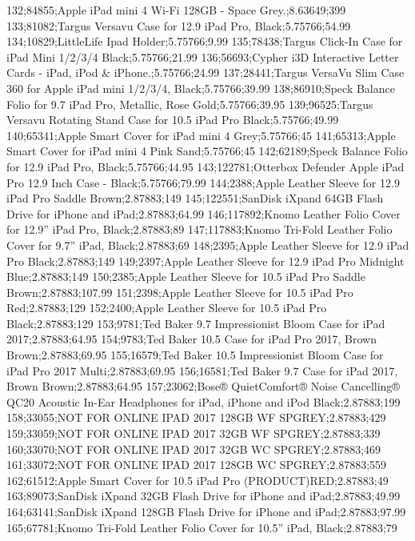 132;84855;Apple iPad mini 4 Wi-Fi 128GB - Space Grey.;8.63649;399
133;81082;Targus Versavu Case for 12.9 iPad Pro, Black;5.75766;54.99
134;10829;LittleLife Ipad Holder;5.75766;9.99
135;78438;Targus Click-In Case for iPad Mini 1/2/3/4 Black;5.75766;21.99
136;56693;Cypher i3D Interactive Letter Cards - iPad, iPod & iPhone.;5.75766;24.99
137;28441;Targus VersaVu Slim Case 360 for Apple iPad mini 1/2/3/4, Black;5.75766;39.99
138;86910;Speck Balance Folio for 9.7 iPad Pro, Metallic, Rose Gold;5.75766;39.95
139;96525;Targus Versavu Rotating Stand Case for 10.5 iPad Pro Black;5.75766;49.99
140;65341;Apple Smart Cover for iPad mini 4 Grey;5.75766;45
141;65313;Apple Smart Cover for iPad mini 4 Pink Sand;5.75766;45
142;62189;Speck Balance Folio for 12.9 iPad Pro, Black;5.75766;44.95
143;122781;Otterbox Defender Apple iPad Pro 12.9 Inch Case - Black;5.75766;79.99
144;2388;Apple Leather Sleeve for 12.9 iPad Pro Saddle Brown;2.87883;149
145;122551;SanDisk iXpand 64GB Flash Drive for iPhone and iPad;2.87883;64.99
146;117892;Knomo Leather Folio Cover for 12.9” iPad Pro, Black;2.87883;89
147;117883;Knomo Tri-Fold Leather Folio Cover for 9.7” iPad, Black;2.87883;69
148;2395;Apple Leather Sleeve for 12.9 iPad Pro Black;2.87883;149
149;2397;Apple Leather Sleeve for 12.9 iPad Pro Midnight Blue;2.87883;149
150;2385;Apple Leather Sleeve for 10.5 iPad Pro Saddle Brown;2.87883;107.99
151;2398;Apple Leather Sleeve for 10.5 iPad Pro Red;2.87883;129
152;2400;Apple Leather Sleeve for 10.5 iPad Pro Black;2.87883;129
153;9781;Ted Baker 9.7 Impressionist Bloom Case for iPad 2017;2.87883;64.95
154;9783;Ted Baker 10.5 Case for iPad Pro 2017, Brown Brown;2.87883;69.95
155;16579;Ted Baker 10.5 Impressionist Bloom Case for iPad Pro 2017 Multi;2.87883;69.95
156;16581;Ted Baker 9.7 Case for iPad 2017, Brown Brown;2.87883;64.95
157;23062;Bose® QuietComfort® Noise Cancelling® QC20 Acoustic In-Ear Headphones for iPad, iPhone and iPod Black;2.87883;199
158;33055;NOT FOR ONLINE IPAD 2017 128GB WF SPGREY;2.87883;429
159;33059;NOT FOR ONLINE IPAD 2017 32GB WF SPGREY;2.87883;339
160;33070;NOT FOR ONLINE IPAD 2017 32GB WC SPGREY;2.87883;469
161;33072;NOT FOR ONLINE IPAD 2017 128GB WC SPGREY;2.87883;559
162;61512;Apple Smart Cover for 10.5 iPad Pro (PRODUCT)RED;2.87883;49
163;89073;SanDisk iXpand 32GB Flash Drive for iPhone and iPad;2.87883;49.99
164;63141;SanDisk iXpand 128GB Flash Drive for iPhone and iPad;2.87883;97.99
165;67781;Knomo Tri-Fold Leather Folio Cover for 10.5” iPad, Black;2.87883;79
